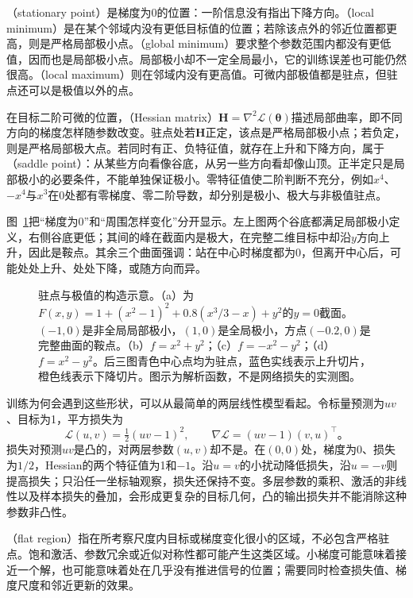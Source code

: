 （stationary point）是梯度为0的位置：一阶信息没有指出下降方向。（local minimum）是在某个邻域内没有更低目标值的位置；若除该点外的邻近位置都更高，则是严格局部极小点。（global minimum）要求整个参数范围内都没有更低值，因而也是局部极小点。局部极小却不一定全局最小，它的训练误差也可能仍然很高。（local maximum）则在邻域内没有更高值。可微内部极值都是驻点，但驻点还可以是极值以外的点。

在目标二阶可微的位置，（Hessian matrix）$\bm H=\nabla^2\mathcal L(\bm\theta)$描述局部曲率，即不同方向的梯度怎样随参数改变。驻点处若$\bm H$正定，该点是严格局部极小点；若负定，则是严格局部极大点。若同时有正、负特征值，就存在上升和下降方向，属于（saddle point）：从某些方向看像谷底，从另一些方向看却像山顶。正半定只是局部极小的必要条件，不能单独保证极小。零特征值使二阶判断不充分，例如$x^4$、$-x^4$与$x^3$在0处都有零梯度、零二阶导数，却分别是极小、极大与非极值驻点。

图~\ref{fig:training-stationary-points}把“梯度为0”和“周围怎样变化”分开显示。左上图两个谷底都满足局部极小定义，右侧谷底更低；其间的峰在截面内是极大，在完整二维目标中却沿$y$方向上升，因此是鞍点。其余三个曲面强调：站在中心时梯度都为0，但离开中心后，可能处处上升、处处下降，或随方向而异。
\begin{figure}[htbp]
  \centering
  
  \caption{驻点与极值的构造示意。（a）为$F(x,y)=1+(x^2-1)^2+0.8(x^3/3-x)+y^2$的$y=0$截面。$(-1,0)$是非全局局部极小，$(1,0)$是全局极小，方点$(-0.2,0)$是完整曲面的鞍点。（b）$f=x^2+y^2$；（c）$f=-x^2-y^2$；（d）$f=x^2-y^2$。后三图青色中心点均为驻点，蓝色实线表示上升切片，橙色线表示下降切片。图示为解析函数，不是网络损失的实测图。}
  \label{fig:training-stationary-points}
\end{figure}

训练为何会遇到这些形状，可以从最简单的两层线性模型看起。令标量预测为$uv$、目标为1，平方损失为
\begin{equation}
  \mathcal L(u,v)=\tfrac12(uv-1)^2,\qquad
  \nabla\mathcal L=(uv-1)(v,u)^{\top}\text{。}
  \label{eq:training-factorized-saddle}
\end{equation}
损失对预测$uv$是凸的，对两层参数$(u,v)$却不是。在$(0,0)$处，梯度为0、损失为$1/2$，Hessian的两个特征值为1和$-1$。沿$u=v$的小扰动降低损失，沿$u=-v$则提高损失；只沿任一坐标轴观察，损失还保持不变。多层参数的乘积、激活的非线性以及样本损失的叠加，会形成更复杂的目标几何，凸的输出损失并不能消除这种参数非凸性。

（flat region）指在所考察尺度内目标或梯度变化很小的区域，不必包含严格驻点。饱和激活、参数冗余或近似对称性都可能产生这类区域。小梯度可能意味着接近一个解，也可能意味着处在几乎没有推进信号的位置；需要同时检查损失值、梯度尺度和邻近更新的效果。

